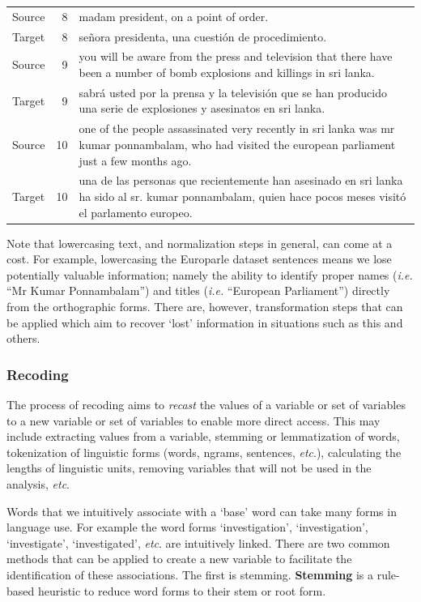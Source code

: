 \documentclass[
  letterpaper,
]{scrbook}
\begin{document}
\begin{table}
\begin{tabular}{lrl}
Source & 8 & madam president, on a point of order.\\
Target & 8 & señora presidenta, una cuestión de procedimiento.\\
Source & 9 & you will be aware from the press and television that there have been a number of bomb explosions and killings in sri lanka.\\
Target & 9 & sabrá usted por la prensa y la televisión que se han producido una serie de explosiones y asesinatos en sri lanka.\\
Source & 10 & one of the people assassinated very recently in sri lanka was mr kumar ponnambalam, who had visited the european parliament just a few months ago.\\
\addlinespace
Target & 10 & una de las personas que recientemente han asesinado en sri lanka ha sido al sr. kumar ponnambalam, quien hace pocos meses visitó el parlamento europeo.\\
\bottomrule
\end{tabular}
\end{table}

Note that lowercasing text, and normalization steps in general, can come
at a cost. For example, lowercasing the Europarle dataset sentences
means we lose potentially valuable information; namely the ability to
identify proper names (\emph{i.e.} ``Mr Kumar Ponnambalam'') and titles
(\emph{i.e.} ``European Parliament'') directly from the orthographic
forms. There are, however, transformation steps that can be applied
which aim to recover `lost' information in situations such as this and
others.

\hypertarget{recoding}{%
\subsubsection{Recoding}\label{recoding}}

The process of recoding aims to \emph{recast} the values of a variable
or set of variables to a new variable or set of variables to enable more
direct access. This may include extracting values from a variable,
stemming or lemmatization of words, tokenization of linguistic forms
(words, ngrams, sentences, \emph{etc}.), calculating the lengths of
linguistic units, removing variables that will not be used in the
analysis, \emph{etc}.

Words that we intuitively associate with a `base' word can take many
forms in language use. For example the word forms `investigation',
`investigation', `investigate', `investigated', \emph{etc}. are
intuitively linked. There are two common methods that can be applied to
create a new variable to facilitate the identification of these
associations. The first is stemming. \textbf{Stemming} is a rule-based
heuristic to reduce word forms to their stem or root form.
\end{document}

